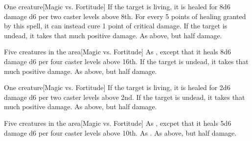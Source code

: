 \spellrng{\rngclose}
\begin{spelltarget}{One creature}[Magic vs. Fortitude]
    \spelleffect If the target is living, it is healed for 8d6 damage \add d6 per two caster levels above 8th. For every 5 points of healing granted by this spell, it can instead cure 1 point of critical damage.
    \spellsuccess If the target is undead, it takes that much positive damage.
    \spellfailure As above, but half damage.
\end{spelltarget}

\spellrng{\rngclose}
\begin{spelltargets}{Five creatures in the area}[Magic vs. Fortitude]
    \spelleffect As , except that it heals 8d6 damage \add d6 per four caster levels above 16th.
    \spellsuccess If the target is undead, it takes that much positive damage.
    \spellfailure As above, but half damage.
\end{spelltargets}

\spellrng{\rngclose}
\begin{spelltarget}{One creature}[Magic vs. Fortitude]
    \spelleffect If the target is living, it is healed for 2d6 damage \add d6 per two caster levels above 2nd.
    \spellsuccess If the target is undead, it takes that much positive damage.
    \spellfailure As above, but half damage.
\end{spelltarget}

\spellrng{\rngclose}
\begin{spelltargets}{Five creatures in the area}[Magic vs. Fortitude]
    \spelleffect As , excpet that it heals 5d6 damage \add d6 per four caster levels above 10th.
    \spellsuccess As .
    \spellfailure As above, but half damage.
\end{spelltargets}

